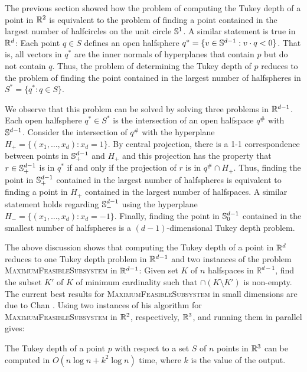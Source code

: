 \documentclass[charterfonts,lotsofwhite]{patmorin}
\begin{document}
The previous section showed how the problem of computing the Tukey
depth of a point in $\mathbb{R}^2$ is equivalent to the problem of finding a
point contained in the largest number of halfcircles on the unit
circle $\mathbb{S}^1$.  A similar statement is true in $\mathbb{R}^d$:  Each point
$q\in S$ defines an open halfsphere $q^*=\{ v\in\mathbb{S}^{d-1} : v\cdot q <
0\}$.  That is, all vectors in $q^*$ are the inner normals of hyperplanes
that contain $p$ but do not contain $q$.  Thus, the problem of
determining the Tukey depth of $p$ reduces to the problem of finding
the point contained in the largest number of halfspheres in $S^*=\{q^*
: q\in S\}$.

We observe that this problem can be solved by solving three problems in
$\mathbb{R}^{d-1}$.  Each open halfsphere $q^*\in S^*$ is the intersection of
an open halfspace $q^\#$ with $\mathbb{S}^{d-1}$.  Consider the intersection
of $q^\#$ with the hyperplane $H_+=\{(x_1,\ldots,x_d):x_d=1\}$.  By
central projection, there is a 1-1 correspondence between points in
$\mathbb{S}^{d-1}_+$ and $H_+$ and this projection has the property that
$r\in\mathbb{S}^{d-1}_+$ is in $q^*$ if and only if the projection of $r$ is
in $q^\#\cap H_+$.  Thus, finding the point in $\mathbb{S}^{d-1}_+$ contained
in the largest number of halfspheres is equivalent to finding a point
in $H_+$ contained in the largest number of halfspaces.  A similar
statement holds regarding $\mathbb{S}^{d-1}_-$ using the hyperplane
$H_-=\{(x_1,\ldots,x_d):x_d=-1\}$.  Finally, finding the point in
$\mathbb{S}^{d-1}_0$ contained in the smallest number of halfspheres is a
$(d-1)$-dimensional Tukey depth problem. 

The above discussion shows that computing the Tukey depth of a point
in $\mathbb{R}^d$ reduces to one Tukey depth problem in $\mathbb{R}^{d-1}$ and two
instances of the problem \textsc{MaximumFeasibleSubsystem} in
$\mathbb{R}^{d-1}$: Given set $K$ of $n$ halfspaces in $\mathbb{R}^{d-1}$,
find the subset $K'$ of $K$ of minimum cardinality such that $\cap
(K\setminus K')$ is non-empty.  The current best results for
\textsc{MaximumFeasibleSubsystem} in small dimensions are due to Chan
\cite{c05}.  Using two instances of his algorithm for
\textsc{MaximumFeasibleSubsystem} in $\mathbb{R}^2$, respectively, $\mathbb{R}^3$, and
running them in parallel gives:

\begin{thm}
The Tukey depth of a point $p$ with respect to a set $S$ of $n$ points
in $\mathbb{R}^3$ can be computed in $O(n\log n + k^2\log n)$ time, where
$k$ is the value of the output.
\end{thm}
\end{document}
